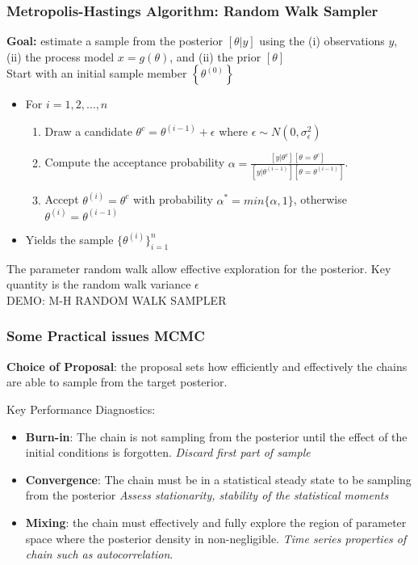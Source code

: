 \documentclass{beamer}
\renewcommand{\bf}{\bfseries}
\begin{document}
\frame
{ \frametitle{Metropolis-Hastings Algorithm: Random Walk Sampler}

\small 
\textbf{Goal:} estimate a sample from the posterior $[\theta | y]$ using the (i) observations $y$, (ii) the process model $x = g(\theta)$, and (ii) the prior $[ \theta ]$ \\ 
Start with an initial sample member $\left \lbrace  \theta^{(0)}  \right \rbrace $ 
\pause
\begin{itemize}	
		\item For $i=1,2,\dots,n$
		\begin{enumerate}
			\item Draw a candidate $\theta^c=\theta^{(i-1)} + \epsilon$ where $\epsilon \sim N(0,\sigma_\epsilon^2)$
			\item Compute the acceptance probability $\alpha= \frac{[y|\theta^c] [\theta = \theta^c]}{[y|\theta^{(i-1)}] [\theta = \theta^{(i-1)}]  } $. 
			\item Accept $\theta^{(i)} = \theta^c$ with probability $\alpha^*=min\{\alpha,1\}$, otherwise $\theta^{(i)} = \theta^{(i-1)}$
		\end{enumerate} 
\pause
		\item Yields the sample $ \{ \theta^{(i)} \}_{i=1}^n $ 
\end{itemize}

\pause
The parameter random walk allow effective exploration for the posterior. Key quantity is the random walk variance $\epsilon$ \\

\pause
\medskip
\color{red} DEMO: M-H RANDOM WALK SAMPLER
}


\frame
{ \frametitle{Some Practical issues MCMC}

\pause
{\bf Choice of Proposal}: the proposal sets how efficiently and effectively the chains are able to sample from the target posterior. 


\pause
\bigskip
Key Performance Diagnostics:
\begin{itemize}
\pause
\item
{\bf Burn-in}: The chain is not sampling from the posterior until the effect of the initial conditions is forgotten. {\it Discard first part of sample}
\pause
\item
{\bf Convergence}: The chain must be in a statistical steady state to be sampling from the posterior {\it Assess stationarity, stability of the statistical moments}
\pause
\item
{\bf Mixing}: the chain must effectively and fully explore the region of parameter space where the posterior density in non-negligible. {\it Time series properties of chain such as autocorrelation}.

\end{itemize}

}



\end{document}

